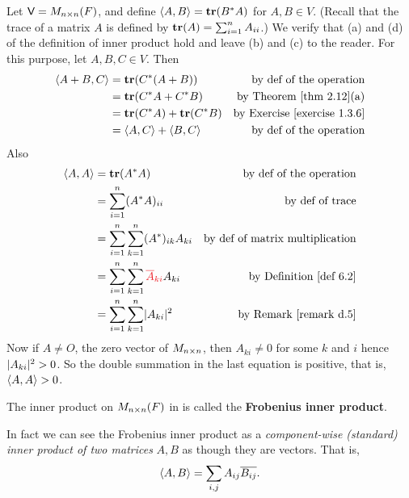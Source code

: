 \begin{example} \label{example 6.1.5}
Let \(\textsf{V} = M_{n \times n}(F)\), and define \(\left< A, B \right> = \textbf{tr}(B^* A)\) for \(A, B \in V\).
(Recall that the trace of a matrix \(A\) is defined by \(\textbf{tr}(A) = \sum_{i = 1}^n A_{ii}\).)
We verify that (a) and (d) of the definition of inner product hold and leave (b) and (c) to the reader. For this purpose, let \(A, B, C \in V\).
Then
\begin{align*}
    \LG A + B, C \RG & = \TRACE(C^* (A + B)) & \text{by def of the operation} \\
        & = \TRACE(C^* A + C^* B) & \text{by \THM{2.12}(a)} \\
        & = \TRACE(C^* A) + \TRACE(C^* B) & \text{by \EXEC{1.3.6}} \\
        & = \LG A, C \RG + \LG B, C \RG & \text{by def of the operation}
\end{align*}
Also
\begin{align*}
    \LG A, A \RG & = \TRACE(A^* A) & \text{by def of the operation} \\
        & = \sum_{i = 1}^n (A^* A)_{ii} & \text{by def of trace} \\
        & = \sum_{i = 1}^n \sum_{k = 1}^n (A^*)_{ik} A_{ki} & \text{by def of matrix multiplication} \\
        & = \sum_{i = 1}^n \sum_{k = 1}^n \RED{\conjugatet{A}_{ki}} A_{ki} & \text{by \DEF{6.2}} \\
        & = \sum_{i = 1}^n \sum_{k = 1}^n \abs{A_{ki}}^2 & \text{by \RMK{d.5}}
\end{align*}
Now if \(A \ne O\), the zero vector of \(M_{n \times n}\), then \(A_{ki} \ne 0\) for some \(k\) and \(i\) hence \(\lvert A_{ki}\rvert^2 > 0\).
So the double summation in the last equation is positive, that is, \(\left< A, A \right> > 0\).
\end{example}

\begin{additional definition} \label{adef 6.1}
The inner product on \(M_{n \times n}(F)\) in  is called the \textbf{Frobenius inner product}.
\end{additional definition}

\begin{remark} \label{remark 6.1.5}
In fact we can see the Frobenius inner product as a \emph{component-wise (standard) inner product of two matrices} \(A, B\) as though they are vectors.
That is,
\[
    \left< A, B \right> = \sum_{i, j} A_{ij} \overline{B_{ij}}.
\]
\end{remark}

